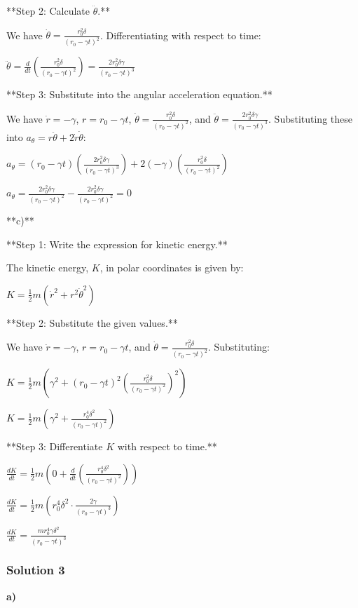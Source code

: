 \documentclass{article}
\begin{document}
**Step 2: Calculate $\ddot{\theta}$.**

We have $\dot{\theta} = \frac{r_0^2\delta}{(r_0 - \gamma t)^2}$. Differentiating with respect to time:

$\ddot{\theta} = \frac{d}{dt} \left( \frac{r_0^2\delta}{(r_0 - \gamma t)^2} \right) = \frac{2r_0^2\delta\gamma}{(r_0 - \gamma t)^3}$

**Step 3: Substitute into the angular acceleration equation.**

We have $\dot{r} = -\gamma$, $r = r_0 - \gamma t$, $\dot{\theta} = \frac{r_0^2\delta}{(r_0 - \gamma t)^2}$, and $\ddot{\theta} = \frac{2r_0^2\delta\gamma}{(r_0 - \gamma t)^3}$. Substituting these into $a_{\theta} = r\ddot{\theta} + 2\dot{r}\dot{\theta}$:

$a_{\theta} = (r_0 - \gamma t)\left(\frac{2r_0^2\delta\gamma}{(r_0 - \gamma t)^3}\right) + 2(-\gamma)\left(\frac{r_0^2\delta}{(r_0 - \gamma t)^2}\right)$

$a_{\theta} = \frac{2r_0^2\delta\gamma}{(r_0 - \gamma t)^2} - \frac{2r_0^2\delta\gamma}{(r_0 - \gamma t)^2} = 0$

**c)**

**Step 1: Write the expression for kinetic energy.**

The kinetic energy, $K$, in polar coordinates is given by:

$K = \frac{1}{2}m(\dot{r}^2 + r^2\dot{\theta}^2)$

**Step 2: Substitute the given values.**

We have $\dot{r} = -\gamma$, $r = r_0 - \gamma t$, and $\dot{\theta} = \frac{r_0^2\delta}{(r_0 - \gamma t)^2}$. Substituting:

$K = \frac{1}{2}m\left(\gamma^2 + (r_0 - \gamma t)^2\left(\frac{r_0^2\delta}{(r_0 - \gamma t)^2}\right)^2\right)$

$K = \frac{1}{2}m\left(\gamma^2 + \frac{r_0^4\delta^2}{(r_0 - \gamma t)^2}\right)$

**Step 3: Differentiate $K$ with respect to time.**

$\frac{dK}{dt} = \frac{1}{2}m\left(0 + \frac{d}{dt}\left(\frac{r_0^4\delta^2}{(r_0 - \gamma t)^2}\right)\right)$

$\frac{dK}{dt} = \frac{1}{2}m\left(r_0^4\delta^2 \cdot \frac{2\gamma}{(r_0 - \gamma t)^3}\right)$

$\frac{dK}{dt} = \frac{mr_0^4\gamma\delta^2}{(r_0 - \gamma t)^3}$


\subsubsection{Solution 3}
\textbf{a)}
\end{document}
